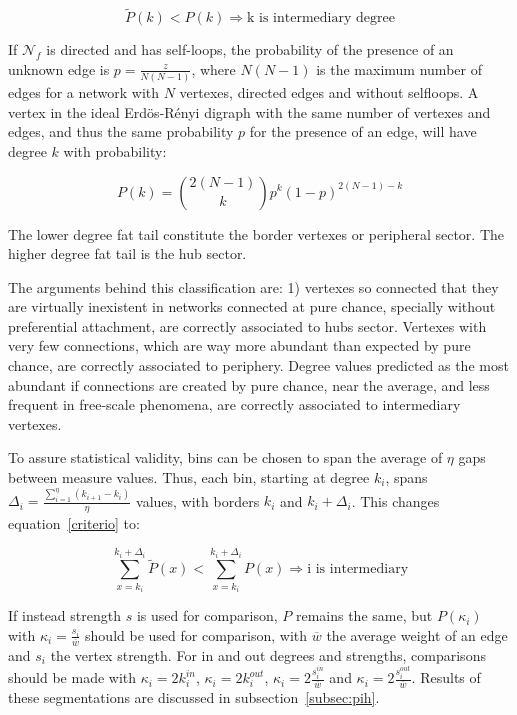 \documentclass[%
 aip,
 jmp,%
 amsmath,amssymb,
 reprint,%
]{revtex4-1}
\begin{document}
\begin{equation}\label{criterio}
    \widetilde{P}(k)<P(k) \Rightarrow \text{k is intermediary degree}
\end{equation}

If $\mathcal{N}_f$ is directed and has self-loops, the probability
of the presence of an unknown edge is $p=\frac{z}{N(N-1)}$, where $N(N-1)$ is the maximum number of edges for a network with $N$ vertexes, directed edges and without selfloops.
A vertex in the ideal Erd\"os-R\'enyi digraph with the same number of vertexes and edges, and thus the same probability $p$ for the presence of an edge, will have degree $k$ with probability:

\begin{equation}
    P(k)=\binom{2(N-1)}{k}p^k(1-p)^{2(N-1)-k}
\end{equation}

The lower degree fat tail constitute the border
vertexes or peripheral sector. 
The higher degree fat tail is the hub sector.

The arguments behind this classification are: 1) vertexes so connected that they are virtually inexistent in networks connected at pure chance, specially without preferential attachment, are correctly associated to hubs sector. Vertexes with very few connections, which are way more abundant than expected by pure chance, are correctly associated to periphery. Degree values predicted as the most abundant if connections are created by pure chance, near the average, and less frequent in free-scale phenomena, are correctly associated to intermediary vertexes.

To assure statistical validity, bins can be chosen to span the average of $\eta$ gaps between measure values. Thus, each bin, starting at degree $k_i$, spans $\Delta_i=\frac{\sum_{i=1}^{\eta}(k_{i+1}-k_i)}{\eta}$ values, with borders $k_i$ and $k_i+\Delta_{i}$. This changes equation~\ref{criterio} to:

\begin{equation}\label{criterio2}
    \sum_{x=k_i}^{k_i+\Delta_i} \widetilde{P}(x) < \sum_{x=k_i}^{k_i+\Delta_i} P(x) \Rightarrow \text{i is intermediary}
\end{equation}

If instead strength $s$ is used for comparison, $P$ remains the same, but $P(\kappa_i)$ with $\kappa_i=\frac{s_i}{\overline{w}}$ should be used for comparison, with $\overline{w}$ the average weight of an edge and $s_i$ the vertex strength. For in and out degrees and strengths, comparisons should be made with $\kappa_i=2k_i^{in}$, $\kappa_i=2k_i^{out}$, $\kappa_i=2\frac{s_i^{in}}{\overline{w}}$ and $\kappa_i=2\frac{s_i^{out}}{\overline{w}}$. Results of these segmentations are discussed in subsection~\ref{subsec:pih}.
\end{document}
